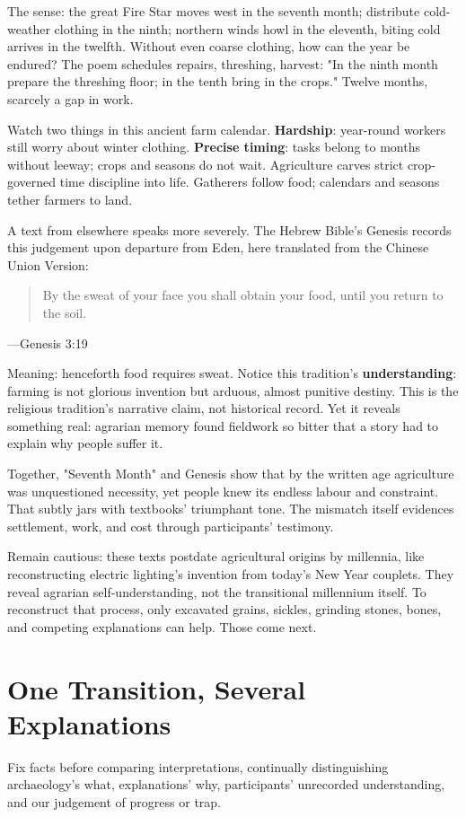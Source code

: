 The sense: the great Fire Star moves west in the seventh month; distribute cold-weather clothing in the ninth; northern winds howl in the eleventh, biting cold arrives in the twelfth. Without even coarse clothing, how can the year be endured? The poem schedules repairs, threshing, harvest: "In the ninth month prepare the threshing floor; in the tenth bring in the crops." Twelve months, scarcely a gap in work.

Watch two things in this ancient farm calendar. \textbf{Hardship}: year-round workers still worry about winter clothing. \textbf{Precise timing}: tasks belong to months without leeway; crops and seasons do not wait. Agriculture carves strict crop-governed time discipline into life. Gatherers follow food; calendars and seasons tether farmers to land.

A text from elsewhere speaks more severely. The Hebrew Bible's Genesis records this judgement upon departure from Eden, here translated from the Chinese Union Version:

\begin{quote}
By the sweat of your face you shall obtain your food, until you return to the soil.
\end{quote}
---Genesis 3:19

Meaning: henceforth food requires sweat. Notice this tradition's \textbf{understanding}: farming is not glorious invention but arduous, almost punitive destiny. This is the religious tradition's narrative claim, not historical record. Yet it reveals something real: agrarian memory found fieldwork so bitter that a story had to explain why people suffer it.

Together, "Seventh Month" and Genesis show that by the written age agriculture was unquestioned necessity, yet people knew its endless labour and constraint. That subtly jars with textbooks' triumphant tone. The mismatch itself evidences settlement, work, and cost through participants' testimony.

Remain cautious: these texts postdate agricultural origins by millennia, like reconstructing electric lighting's invention from today's New Year couplets. They reveal agrarian self-understanding, not the transitional millennium itself. To reconstruct that process, only excavated grains, sickles, grinding stones, bones, and competing explanations can help. Those come next.

\section{One Transition, Several Explanations}
Fix facts before comparing interpretations, continually distinguishing archaeology's what, explanations' why, participants' unrecorded understanding, and our judgement of progress or trap.

